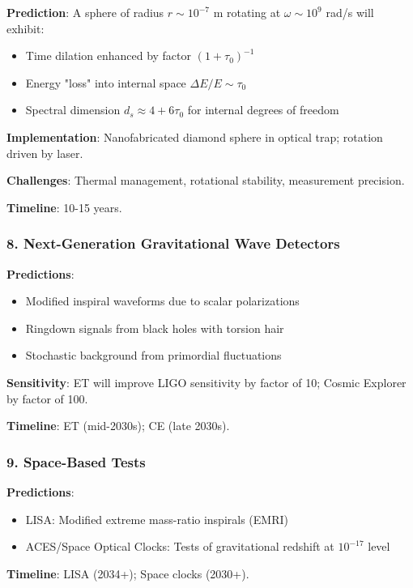\begin{test}
\textbf{Prediction}: A sphere of radius $r \sim 10^{-7}$ m rotating at $\omega \sim 10^9$ rad/s will exhibit:
\begin{itemize}
    \item Time dilation enhanced by factor $(1 + \tau_0)^{-1}$
    \item Energy "loss" into internal space $\Delta E/E \sim \tau_0$
    \item Spectral dimension $d_s \approx 4 + 6\tau_0$ for internal degrees of freedom
\end{itemize}

\textbf{Implementation}: Nanofabricated diamond sphere in optical trap; rotation driven by laser.

\textbf{Challenges}: Thermal management, rotational stability, measurement precision.

\textbf{Timeline}: 10-15 years.
\end{test}

\subsubsection{8. Next-Generation Gravitational Wave Detectors}

\begin{test}
\textbf{Predictions}:
\begin{itemize}
    \item Modified inspiral waveforms due to scalar polarizations
    \item Ringdown signals from black holes with torsion hair
    \item Stochastic background from primordial fluctuations
\end{itemize}

\textbf{Sensitivity}: ET will improve LIGO sensitivity by factor of 10; Cosmic Explorer by factor of 100.

\textbf{Timeline}: ET (mid-2030s); CE (late 2030s).
\end{test}

\subsubsection{9. Space-Based Tests}

\begin{test}
\textbf{Predictions}:
\begin{itemize}
    \item LISA: Modified extreme mass-ratio inspirals (EMRI)
    \item ACES/Space Optical Clocks: Tests of gravitational redshift at $10^{-17}$ level
\end{itemize}

\textbf{Timeline}: LISA (2034+); Space clocks (2030+).
\end{test}

